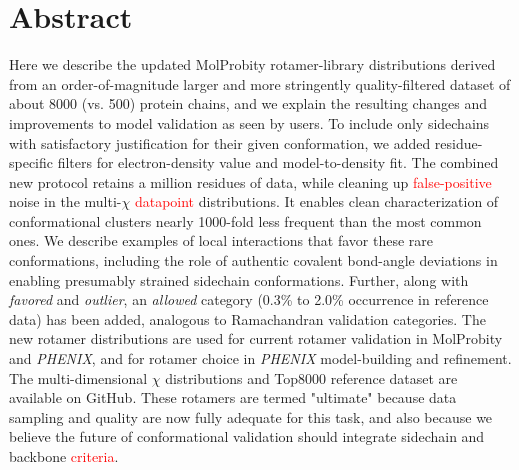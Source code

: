 \section{Abstract}

Here we describe the updated MolProbity rotamer-library distributions derived from an order-of-magnitude larger and more stringently quality-filtered dataset of about 8000 (vs. 500) protein chains, and we explain the resulting changes and improvements to model validation as seen by users. To include only sidechains with satisfactory justification for their given conformation, we added residue-specific filters for electron-density value and model-to-density fit.  The combined new protocol retains a million residues of data, while cleaning up \textcolor{red}{false-positive} noise in the multi-$\chi$ \textcolor{red}{datapoint} distributions.  It enables clean characterization of conformational clusters nearly 1000-fold less frequent than the most common ones.  We describe examples of local interactions that favor these rare conformations, including the role of authentic covalent bond-angle deviations in enabling presumably strained sidechain conformations. Further, along with \textit{favored} and \textit{outlier}, an \textit{allowed} category (0.3\% to 2.0\% occurrence in reference data) has been added, analogous to Ramachandran validation categories. The new rotamer distributions are used for current rotamer validation in MolProbity and \textit{PHENIX}, and for rotamer choice in \textit{PHENIX} model-building and refinement. The multi-dimensional $\chi$ distributions and Top8000 reference dataset are available on GitHub. These rotamers are termed "ultimate" because data sampling and quality are now fully adequate for this task, and also because we believe the future of conformational validation should integrate sidechain and backbone \textcolor{red}{criteria}.
